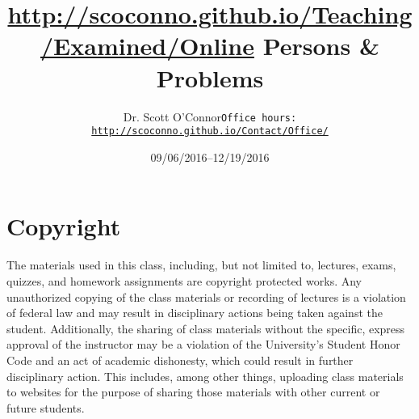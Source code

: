 \documentclass[article,oneside]{memoir}
\def\myauthor{Author}
\def\mytitle{Title}
\def\mycopyright{\myauthor}
\def\myweb{\href{http://scoconno.github.io/Teaching/Examined/Online}{http://scoconno.github.io/Teaching/Examined/Online}}
\def\myauthor{Dr. Scott O'Connor}
\def\mytitle{{\normalsize \myweb \newline} \HUGE Persons \& Problems}
\begin{document}
\setsansfont[Mapping=tex-text]{Myriad Pro} 
\setmonofont[Mapping=tex-text,Scale=0.8]{Georgia} 

\def\ind{\hangindent=1 true cm\hangafter=1 \noindent}
\def\labelitemi{$\cdot$}


\title{\LARGE \mytitle}     
\author{\Large\myauthor \newline \footnotesize\texttt{\noindent Office hours: \href{http://scoconno.github.io/Contact/Office/}{http://scoconno.github.io/Contact/Office/}}}
\date{09/06/2016--12/19/2016}


\maketitle




%
%

\section{Copyright}
The materials used in this class, including, but not limited to, lectures, exams, quizzes, and homework assignments are copyright protected works.  Any unauthorized copying of the class materials or recording of lectures is a violation of federal law and may result in disciplinary actions being taken against the student.  Additionally, the sharing of class materials without the specific, express approval of the instructor may be a violation of the University's Student Honor Code and an act of academic dishonesty, which could result in further disciplinary action.  This includes, among other things, uploading class materials to websites for the purpose of sharing those materials with other current or future students. 
\end{document}
